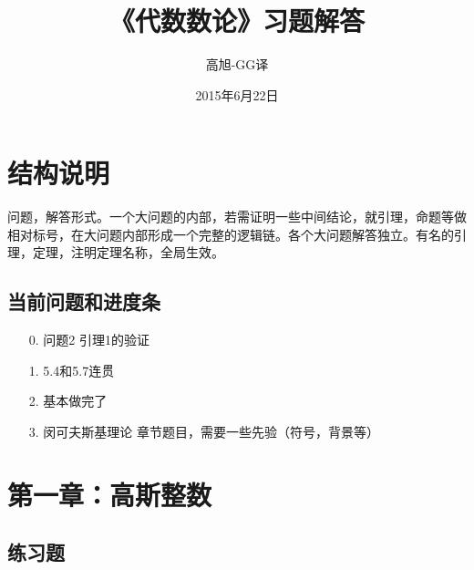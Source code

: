 \documentclass[UTF8]{ctexart}
\begin{document}
\tableofcontents

\title{《代数数论》习题解答}
\author{高旭-GG译}
\date{2015年6月22日}
\maketitle

\section{结构说明}
问题，解答形式。一个大问题的内部，若需证明一些中间结论，就引理，命题等做相对标号，在大问题内部形成一个完整的逻辑链。各个大问题解答独立。有名的引理，定理，注明定理名称，全局生效。

\subsection{当前问题和进度条}
\begin{itemize}
    \item[0.] 问题2 引理1的验证
    \item[1.] 5.4和5.7连贯
    \item[2.] 基本做完了
    \item[3.] 闵可夫斯基理论 章节题目，需要一些先验（符号，背景等）
\end{itemize}

\section{第一章：高斯整数}

\subsection{练习题}
\end{document}
